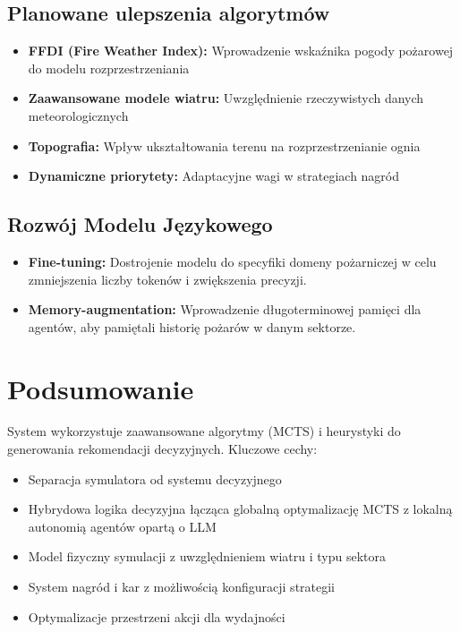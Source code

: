\documentclass[11pt,a4paper]{article}
\begin{document}
\subsection{Planowane ulepszenia algorytmów}

\begin{itemize}
    \item \textbf{FFDI (Fire Weather Index):} Wprowadzenie wskaźnika pogody pożarowej do modelu rozprzestrzeniania
    \item \textbf{Zaawansowane modele wiatru:} Uwzględnienie rzeczywistych danych meteorologicznych
    \item \textbf{Topografia:} Wpływ ukształtowania terenu na rozprzestrzenianie ognia
    \item \textbf{Dynamiczne priorytety:} Adaptacyjne wagi w strategiach nagród
\end{itemize}

\subsection{Rozwój Modelu Językowego}

\begin{itemize}
    \item \textbf{Fine-tuning:} Dostrojenie modelu do specyfiki domeny pożarniczej w celu zmniejszenia liczby tokenów i zwiększenia precyzji.
    \item \textbf{Memory-augmentation:} Wprowadzenie długoterminowej pamięci dla agentów, aby pamiętali historię pożarów w danym sektorze.
\end{itemize}

\section{Podsumowanie}

System wykorzystuje zaawansowane algorytmy (MCTS) i heurystyki do generowania rekomendacji decyzyjnych. Kluczowe cechy:

\begin{itemize}
    \item Separacja symulatora od systemu decyzyjnego
    \item Hybrydowa logika decyzyjna łącząca globalną optymalizację MCTS z lokalną autonomią agentów opartą o LLM
    \item Model fizyczny symulacji z uwzględnieniem wiatru i typu sektora
    \item System nagród i kar z możliwością konfiguracji strategii
    \item Optymalizacje przestrzeni akcji dla wydajności
\end{itemize}
\end{document}
